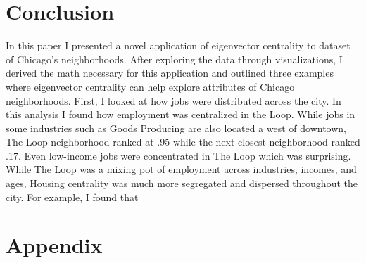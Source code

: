 \documentclass{article}
\theoremstyle{definition}
\theoremstyle{remark}
\begin{document}

\section{Conclusion}
In this paper I presented a novel application of eigenvector centrality to dataset of Chicago's neighborhoods.  After exploring the data through visualizations, I derived the math necessary for this application and outlined three examples where eigenvector centrality can help explore attributes of Chicago neighborhoods.  First, I looked at how jobs were distributed across the city.  In this analysis I found how employment was centralized in the Loop.  While jobs in some industries such as Goods Producing are also located a west of downtown, The Loop neighborhood ranked at .95 while the next closest neighborhood ranked .17.  Even low-income jobs were concentrated in The Loop which was surprising.  While The Loop was a mixing pot of employment across industries, incomes, and ages, Housing centrality was much more segregated and dispersed throughout the city.  For example, I found that 

\section{Appendix}
\end{document}
